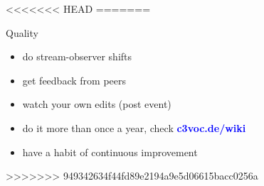\documentclass[aspectratio=169]{beamer}
\begin{document}
<<<<<<< HEAD
=======
\begin{frame}{Quality}
\begin{itemize}
\item do stream-observer shifts %
\item get feedback from peers %
\item watch your own edits (post event) %
\item do it more than once a year, check \textcolor{blue}{\textbf{c3voc.de/wiki }} %
\item have a habit of continuous improvement %
\end{itemize} 
\end{frame}
>>>>>>> 949342634f44fd89e2194a9e5d06615bacc0256a
\end{document}
